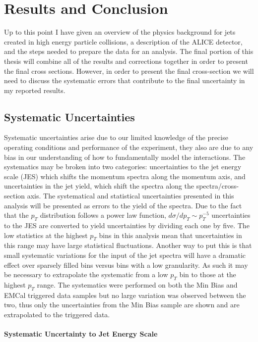 \chapter{Results and Conclusion} \label{ch:cando}

Up to this point I have given an overview of the physics background for jets created in high energy particle collisions, a description of the ALICE detector, and the steps needed to prepare the data for an analysis.  The final portion of this thesis will combine all of the results and corrections together in order to present the final cross sections.  However, in order to present the final cross-section we will need to discuss the systematic errors that contribute to the final uncertainty in my reported results.

\section{Systematic Uncertainties}

Systematic uncertainties arise due to our limited knowledge of the precise operating conditions and performance of the experiment, they also are due to any bias in our understanding of how to fundamentally model the interactions.  The systematics may be broken into two categories: uncertainties to the jet energy scale (JES) which shifts the momentum spectra along the momentum axis, and uncertainties in the jet yield, which shift the spectra along the spectra/cross-section axis.  The systematical and statistical uncertainties presented in this analysis will be presented as errors to the yield of the spectra.  Due to the fact that the $p_{T}$ distribution follows a power law function, $d\sigma/dp_{T} \sim p_{T}^{-5}$ uncertainties to the JES are converted to yield uncertainties by dividing each one by five.
The low statistics at the highest $p_{T}$ bins in this analysis mean that uncertainties in this range may have large statistical fluctuations.  Another way to put this is that small systematic variations for the input of the jet spectra will have a dramatic effect over sparsely filled bins versus bins with a low granularity.  As such it may be necessary to extrapolate the systematic from a low $p_{T}$ bin to those at the highest $p_{T}$ range.  The systematics were performed on both the Min Bias and EMCal triggered data samples but no large variation was observed between the two, thus only the uncertainties from the Min Bias sample are shown and are extrapolated to the triggered data.


\subsubsection{Systematic Uncertainty to Jet Energy Scale}

